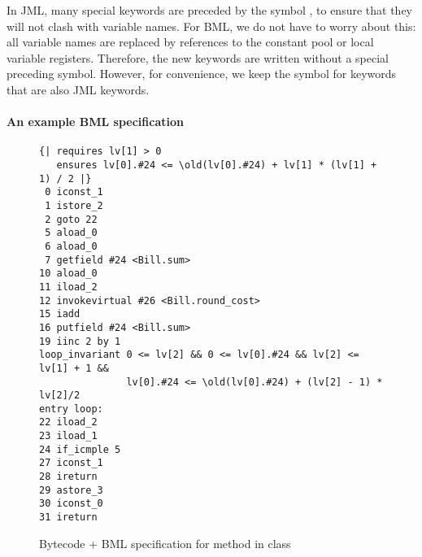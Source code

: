 

In JML, many special keywords are preceded by the symbol
\codeHook{\bsl}, to ensure that they will not clash with variable
names. For BML, we do not have to worry about this: all
variable names are replaced by references to the constant pool or
local variable registers. Therefore, the new keywords are written
without a special preceding symbol. However, for convenience, we keep
the symbol for keywords that are also JML keywords.



\paragraph{An example BML specification}
\label{sec:bml:example}


\begin{figure}[t]
{\small
\begin{verbatim}
{| requires lv[1] > 0 
   ensures lv[0].#24 <= \old(lv[0].#24) + lv[1] * (lv[1] + 1) / 2 |}
 0 iconst_1
 1 istore_2
 2 goto 22 
 5 aload_0
 6 aload_0
 7 getfield #24 <Bill.sum>
10 aload_0
11 iload_2
12 invokevirtual #26 <Bill.round_cost>
15 iadd
16 putfield #24 <Bill.sum>
19 iinc 2 by 1
loop_invariant 0 <= lv[2] && 0 <= lv[0].#24 && lv[2] <= lv[1] + 1 && 
               lv[0].#24 <= \old(lv[0].#24) + (lv[2] - 1) * lv[2]/2
entry loop:
22 iload_2
23 iload_1
24 if_icmple 5 
27 iconst_1
28 ireturn
29 astore_3
30 iconst_0
31 ireturn
\end{verbatim}
}
\caption{Bytecode + BML specification for method  in class }\label{FigBMLSpec}
\end{figure}

